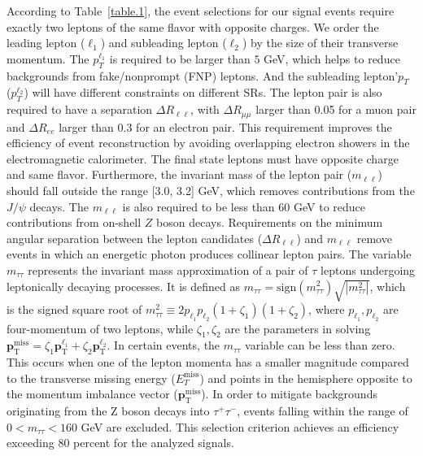 \documentclass[preprint, superscriptaddress,amsmath, nofootinbib]{revtex4-1}
\begin{document}
According to Table~\ref{table.1}, the event selections for our signal events require exactly two leptons of the same flavor with opposite charges. We order the leading lepton ($\ell_1$) and subleading lepton ($\ell_2$) by the size of their transverse momentum. The $p_T^{\ell_1}$ is required to be larger than $5$ GeV, which helps to reduce backgrounds from fake/nonprompt (FNP) leptons. And the subleading lepton'$p_{T}$ ($p_T^{\ell_2}$) will have different constraints on different SRs. The lepton pair is also required to have a separation $\Delta R_{\ell \ell}$, with $\Delta R_{\mu \mu}$ larger than 0.05 for a muon pair and $\Delta R_{ee}$ larger than 0.3 for an electron pair. This requirement improves the efficiency of event reconstruction by avoiding overlapping electron showers in the electromagnetic calorimeter. The final state leptons must have opposite charge and same flavor. Furthermore, the invariant mass of the lepton pair ($m_{\ell \ell}$) should fall outside the range [3.0, 3.2] GeV, which removes contributions from the $J/\psi$ decays. The $m_{\ell \ell}$ is also required to be less than 60 GeV to reduce contributions from on-shell $Z$ boson decays. Requirements on the minimum angular separation between the lepton candidates ($\Delta R_{\ell\ell}$) and $m_{\ell\ell}$ remove events in which an energetic photon produces collinear lepton pairs. The variable $m_{\tau\tau}$ represents the invariant mass approximation of a pair of $\tau$ leptons undergoing leptonically decaying processes. It is defined as $m_{\tau \tau} = \text{sign}(m_{\tau \tau}^2)\sqrt{|m_{\tau \tau}^2|}$, which is the signed square root of $m_{\tau \tau}^2 \equiv 2p_{\ell_{1}}p_{\ell_{2}}(1+\zeta_1)(1+\zeta_2)$, where $p_{\ell_{1}},p_{\ell_{2}}$ are four-momentum of two leptons, while $\zeta_1 , \zeta_2$ are the parameters in solving $\mathbf{p}_\text{T}^\text{miss} = \zeta_1 \mathbf{p}_\text{T}^{\ell_1}+\zeta_2 \mathbf{p}_\text{T}^{\ell_2}$. In certain events, the $m_{\tau\tau}$ variable can be less than zero. This occurs when one of the lepton momenta has a smaller magnitude compared to the transverse missing energy ($E_T^\text{miss}$) and points in the hemisphere opposite to the momentum imbalance vector ($\mathbf{p}^\text{miss}_\text{T}$).  
In order to mitigate backgrounds originating from the Z boson decays into $\tau^+\tau^-$, events falling within the range of $0 < m_{\tau \tau} < 160$ GeV are excluded. This selection criterion achieves an efficiency exceeding 80 percent for the analyzed signals. 
\end{document}
